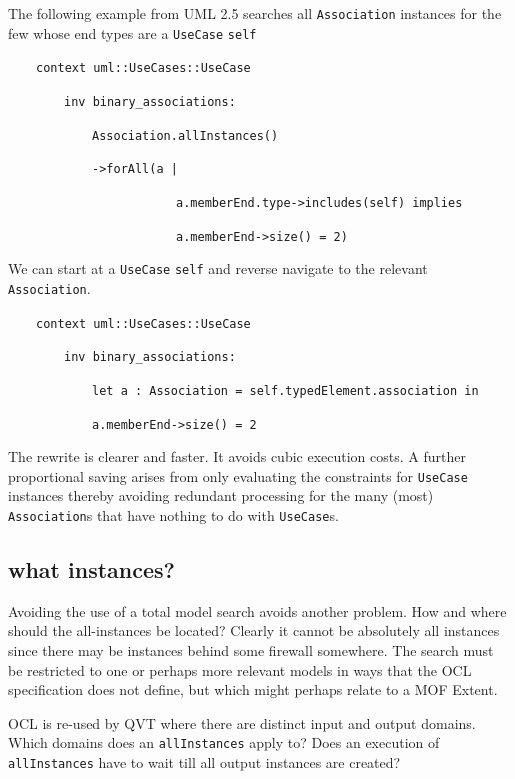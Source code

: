\documentclass[
]{ceurart}
\begin{document}
The following example from UML 2.5 searches all \verb!Association! instances for the few whose end types are a \verb!UseCase! \verb!self!

\begin{description}[itemsep=-0.2cm]\small
\item ~~~~\verb!context uml::UseCases::UseCase!
\item ~~~~~~~~\verb!inv binary_associations:!
\item ~~~~~~~~~~~~\verb!Association.allInstances()!
\item ~~~~~~~~~~~~\verb!->forAll(a |!
\item ~~~~~~~~~~~~~~~~~~~~~~~~\verb!a.memberEnd.type->includes(self) implies!
\item ~~~~~~~~~~~~~~~~~~~~~~~~\verb!a.memberEnd->size() = 2)!
\end{description}

We can start at a \verb!UseCase! \verb!self! and reverse navigate to the relevant \verb!Association!.
\begin{description}[itemsep=-0.2cm]\small
\item ~~~~\verb!context uml::UseCases::UseCase!
\item ~~~~~~~~\verb!inv binary_associations:!
\item ~~~~~~~~~~~~\verb!let a : Association = self.typedElement.association in!
\item ~~~~~~~~~~~~\verb!a.memberEnd->size() = 2!
\end{description}

The rewrite is clearer and faster. It avoids cubic execution costs. A further proportional saving arises from only evaluating the constraints for \verb!UseCase! instances thereby avoiding redundant processing for the many (most) \verb!Association!s that have nothing to do with \verb!UseCase!s.

\subsection{what instances?}

Avoiding the use of a total model search avoids another problem. How and where should the all-instances be located? Clearly it cannot be absolutely all instances since there may be instances behind some firewall somewhere. The search must be restricted to one or perhaps more relevant models in ways that the OCL specification does not define, but which might perhaps relate to a MOF Extent.

OCL is re-used by QVT \cite{QVT-1.3} where there are distinct input and output domains. Which domains does an \verb!allInstances! apply to? Does an execution of \verb!allInstances! have to wait till all output instances are created? 
\end{document}
